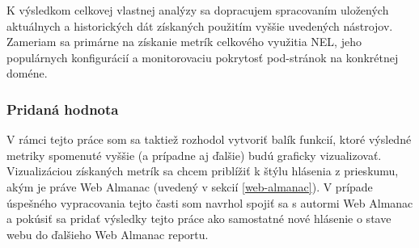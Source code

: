 K výsledkom celkovej vlastnej analýzy sa dopracujem spracovaním uložených aktuálnych a historických dát získaných použitím vyššie uvedených nástrojov.
Zameriam sa primárne na získanie metrík celkového využitia NEL, jeho populárnych konfigurácií a monitorovaciu pokrytosť pod-stránok na konkrétnej doméne.


\subsubsection{Pridaná hodnota}

V rámci tejto práce som sa taktiež rozhodol vytvoriť balík funkcií, ktoré výsledné metriky spomenuté vyššie (a prípadne aj ďalšie) budú graficky vizualizovať.
Vizualizáciou získaných metrík sa chcem priblížiť k štýlu hlásenia z prieskumu, akým je práve Web Almanac (uvedený v sekcií \ref{web-almanac}).
V prípade úspešného vypracovania tejto časti som navrhol spojiť sa s autormi Web Almanac a pokúsiť sa pridať výsledky tejto práce ako samostatné nové hlásenie o stave webu do ďalšieho Web Almanac reportu. 
